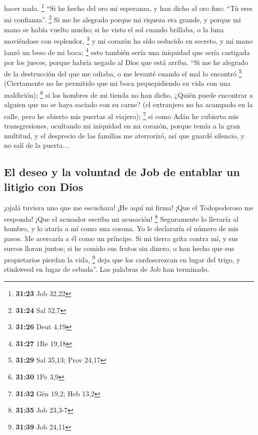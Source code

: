hacer nada. \footnote{\textbf{31:23} Job 32,22}  ``Si he
hecho del oro mi esperanza, y han dicho al oro fino: ``Tú eres mi
confianza''. \footnote{\textbf{31:24} Sal 52,7}  Si me he
alegrado porque mi riqueza era grande, y porque mi mano se había vuelto
mucho;  si he visto el sol cuando brillaba, o la luna
moviéndose con esplendor, \footnote{\textbf{31:26} Deut 4,19}
 y mi corazón ha sido seducido en secreto, y mi mano
lanzó un beso de mi boca; \footnote{\textbf{31:27} 1Re 19,18}
 esto también sería una iniquidad que sería castigada por
los jueces, porque habría negado al Dios que está arriba.
 ``Si me he alegrado de la destrucción del que me odiaba,
o me levanté cuando el mal lo encontró \footnote{\textbf{31:29} Sal
  35,13; Prov 24,17}  (Ciertamente no he permitido que mi
boca pequepidiendo su vida con una maldición); \footnote{\textbf{31:30}
  1Pe 3,9}  si los hombres de mi tienda no han dicho,
¿Quién puede encontrar a alguien que no se haya saciado con su carne?
 (el extranjero no ha acampado en la calle, pero he
abierto mis puertas al viajero); \footnote{\textbf{31:32} Gén 19,2; Heb
  13,2}  si como Adán he cubierto mis transgresiones,
ocultando mi iniquidad en mi corazón,  porque temía a la
gran multitud, y el desprecio de las familias me aterrorizó, así que
guardé silencio, y no salí de la puerta...

\hypertarget{el-deseo-y-la-voluntad-de-job-de-entablar-un-litigio-con-dios}{%
\subsection{El deseo y la voluntad de Job de entablar un litigio con
Dios}\label{el-deseo-y-la-voluntad-de-job-de-entablar-un-litigio-con-dios}}

 ¡ojalá tuviera uno que me escuchara! ¡He aquí mi firma!
¡Que el Todopoderoso me responda! ¡Que el acusador escriba mi acusación!
\footnote{\textbf{31:35} Job 23,3-7}  Seguramente lo
llevaría al hombro, y lo ataría a mí como una corona.  Yo
le declararía el número de mis pasos. Me acercaría a él como un
príncipe.  Si mi tierra grita contra mí, y sus surcos
lloran juntos;  si he comido sus frutos sin dinero, o han
hecho que sus propietarios pierdan la vida, \footnote{\textbf{31:39} Job
  24,11}  deja que los cardoscrezcan en lugar del trigo,
y stinkweed en lugar de cebada''. Las palabras de Job han terminado.

